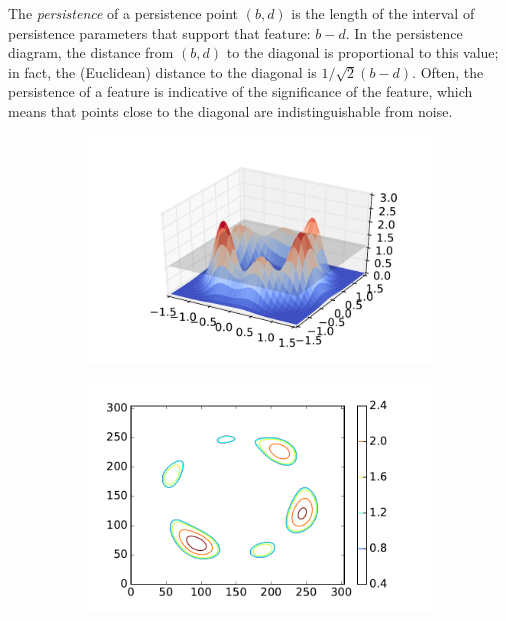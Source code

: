 \documentclass[12pt]{article}
\begin{document}
The \emph{persistence} of a persistence point $(b,d)$ is the length of the interval of persistence parameters that support that feature: $b-d$.  In the persistence diagram, the distance from $(b,d)$ to the diagonal is proportional to this value; in fact, the (Euclidean) distance to the diagonal is $1/\sqrt{2}(b-d)$. Often, the persistence of a feature is indicative of the
significance of the feature, which means that points close to the diagonal are indistinguishable from noise.

\begin{figure}
  \begin{subfigure}{.27\linewidth}
    \centering
    \caption{}  
        \includegraphics[width=\linewidth]{tmp2.pdf}
    \label{fig:example_3d}
  \end{subfigure}
    \begin{subfigure}{.25\linewidth}
    \centering
    \caption{}  
        \includegraphics[width=\linewidth]{tmp4.pdf}

\end{subfigure}
\end{figure}
\end{document}
